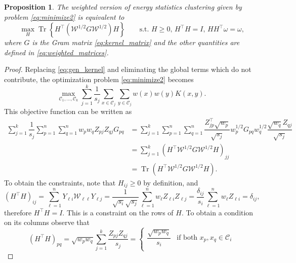 \documentclass[aps,preprint,nofootinbib,floatfix]{revtex4-1}
\newtheorem{proposition}[theorem]{Proposition}
\DeclareMathOperator{\Tr}{Tr}
\newcommand\kk{K}
\newcommand\C{{\mathcal{C}}}
\newcommand\om{\omega}
\begin{document}
\begin{proposition}
\label{th:qcqp3}
The weighted version of energy statistics clustering given by
problem \eqref{eq:minimize2} is equivalent to
\begin{equation}
\label{eq:qcqp3}
\max_H \Tr \left\{ H^\top (\mathcal{W}^{1/2} G \mathcal{W}^{1/2}) H  \right\}
\qquad \mbox{s.t. $H \ge 0$, $H^\top H = I$, $H H^\top \om =
\om$,}
\end{equation}
where $G$ is the Gram matrix \eqref{eq:kernel_matrix} and the other quantities
are defined in 
\eqref{eq:weighted_matrices}.
\end{proposition}
\begin{proof}
Replacing \eqref{eq:gen_kernel} and eliminating the global terms which 
do not contribute, the optimization problem \eqref{eq:minimize2}
becomes 
\begin{equation}
\max_{\C_1,\dotsc,\C_k} \sum_{j=1}^k \dfrac{1}{s_j}
\sum_{x\in\C_j}\sum_{y\in\C_j} w(x)w(y) \kk(x,y) . 
\end{equation}
This 
objective function can be written as
\begin{equation}
\begin{split}
\sum_{j=1}^k \dfrac{1}{s_j} 
\sum_{p=1}^n \sum_{q=1}^n 
w_p w_q Z_{pj} Z_{qj} G_{pq} &= 
\sum_{j=1}^k 
\sum_{p=1}^n \sum_{q=1}^n 
\dfrac{Z^\top_{jp}\sqrt{w_p}}{\sqrt{s_j}} w_p^{1/2} G_{pq} w_q^{1/2} 
\dfrac{\sqrt{w_q} Z_{qj}}{\sqrt{s_j}} \\
&= 
\sum_{j=1}^k \left(H^\top \mathcal{W}^{1/2} G \mathcal{W}^{1/2} H\right)_{jj}
\\
&= \Tr\left( H^\top \mathcal{W}^{1/2} G \mathcal{W}^{1/2} H  \right).
\end{split}
\end{equation}
To obtain the constraints, note that $H_{ij} \ge 0$ by definition, and
\begin{equation}
(H^\top H)_{ij} = \sum_{\ell=1}^n 
Y_{\ell i} \mathcal{W}_{\ell \ell} Y_{\ell j } = 
\dfrac{1}{\sqrt{s_i}\sqrt{s_j}} \sum_{\ell=1}^n w_\ell Z_{\ell i} Z_{\ell j}
= \dfrac{\delta_{ij}}{s_i} \sum_{\ell=1}^n w_\ell Z_{\ell i} = \delta_{ij},
\end{equation}
therefore $H^\top H = I$. This is a constraint on the rows of $H$.
To obtain a condition on its columns
observe that
\begin{equation}
\left(H^\top H\right)_{pq} = \sqrt{w_p w_q}\sum_{j=1}^k \dfrac{Z_{pj}
Z_{qj}}{s_j} = \begin{cases}
\dfrac{\sqrt{w_p w_q}}{s_i} & \mbox{if both $x_p,x_q \in \C_i$} \\

\end{cases}
\end{equation}
\end{proof}
\end{document}
